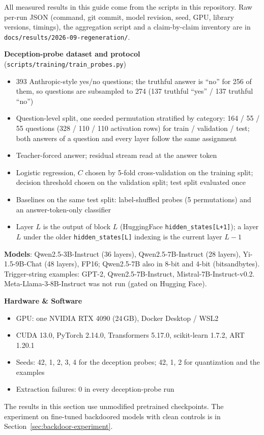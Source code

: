 \documentclass[11pt,letterpaper]{article}
\newcommand{\resultsdir}{\texttt{docs/results/2026-09-regeneration/}}
\begin{document}
\begin{keyconceptbox}
All measured results in this guide come from the scripts in this repository. Raw per-run JSON (command, git commit, model revision, seed, GPU, library versions, timings), the aggregation script and a claim-by-claim inventory are in \resultsdir.

\textbf{Deception-probe dataset and protocol} (\texttt{scripts/training/train\_probes.py})
\begin{itemize}[nosep]
  \item 393 Anthropic-style yes/no questions; the truthful answer is ``no'' for 256 of them, so questions are subsampled to 274 (137 truthful ``yes'' / 137 truthful ``no'')
  \item Question-level split, one seeded permutation stratified by category: 164 / 55 / 55 questions (328 / 110 / 110 activation rows) for train / validation / test; both answers of a question and every layer follow the same assignment
  \item Teacher-forced answer; residual stream read at the answer token
  \item Logistic regression, $C$ chosen by 5-fold cross-validation on the training split; decision threshold chosen on the validation split; test split evaluated once
  \item Baselines on the same test split: label-shuffled probes (5 permutations) and an answer-token-only classifier
  \item Layer $L$ is the output of block $L$ (HuggingFace \texttt{hidden\_states[L+1]}); a layer $L$ under the older \texttt{hidden\_states[L]} indexing is the current layer $L-1$
\end{itemize}

\textbf{Models}: Qwen2.5-3B-Instruct (36 layers), Qwen2.5-7B-Instruct (28 layers), Yi-1.5-9B-Chat (48 layers), FP16; Qwen2.5-7B also in 8-bit and 4-bit (bitsandbytes). Trigger-string examples: GPT-2, Qwen2.5-7B-Instruct, Mistral-7B-Instruct-v0.2. Meta-Llama-3-8B-Instruct was not run (gated on Hugging Face).

\textbf{Hardware \& Software}
\begin{itemize}[nosep]
  \item GPU: one NVIDIA RTX 4090 (24\,GB), Docker Desktop / WSL2
  \item CUDA 13.0, PyTorch 2.14.0, Transformers 5.17.0, scikit-learn 1.7.2, ART 1.20.1
  \item Seeds: 42, 1, 2, 3, 4 for the deception probes; 42, 1, 2 for quantization and the examples
  \item Extraction failures: 0 in every deception-probe run
\end{itemize}

The results in this section use unmodified pretrained checkpoints. The experiment on fine-tuned backdoored models with clean controls is in Section~\ref{sec:backdoor-experiment}.
\end{keyconceptbox}
\end{document}
